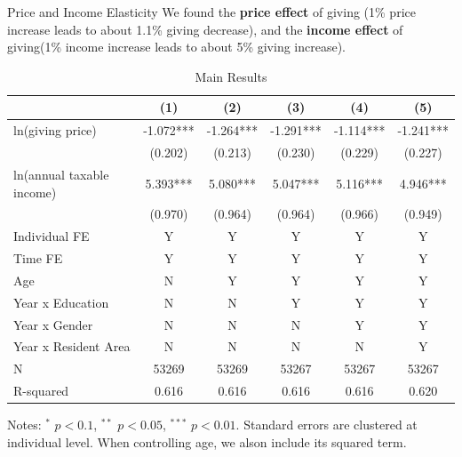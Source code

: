 \documentclass[
  ignorenonframetext,
]{beamer}
\begin{document}
\begin{frame}{Price and Income Elasticity}
\protect\hypertarget{price-and-income-elasticity}{}
We found the \textbf{price effect} of giving (1\% price increase leads to about 1.1\% giving decrease),
and the \textbf{income effect} of giving(1\% income increase leads to about 5\% giving increase).

\begin{table}

\caption{\label{tab:kableEstimateElasticityPart1}Main Results}
\centering
\fontsize{7}{9}\selectfont
\begin{threeparttable}
\begin{tabular}[t]{lccccc}
\toprule
 & (1) & (2) & (3) & (4) & (5)\\
\midrule
ln(giving price) & -1.072*** & -1.264*** & -1.291*** & -1.114*** & -1.241***\\
 & (0.202) & (0.213) & (0.230) & (0.229) & (0.227)\\
ln(annual taxable income) & 5.393*** & 5.080*** & 5.047*** & 5.116*** & 4.946***\\
 & (0.970) & (0.964) & (0.964) & (0.966) & (0.949)\\
Individual FE & Y & Y & Y & Y & Y\\
Time FE & Y & Y & Y & Y & Y\\
Age & N & Y & Y & Y & Y\\
Year x Education & N & N & Y & Y & Y\\
Year x Gender & N & N & N & Y & Y\\
Year x Resident Area & N & N & N & N & Y\\
N & 53269 & 53269 & 53267 & 53267 & 53267\\
R-squared & 0.616 & 0.616 & 0.616 & 0.616 & 0.620\\
\bottomrule
\end{tabular}
\begin{tablenotes}
\item Notes: $^{*}$ $p < 0.1$, $^{**}$ $p < 0.05$, $^{***}$ $p < 0.01$. Standard errors are clustered at individual level. When controlling age, we alson include its squared term.
\end{tablenotes}
\end{threeparttable}
\end{table}
\end{frame}
\end{document}
